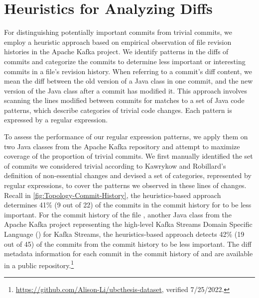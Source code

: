 \section{Heuristics for Analyzing Diffs}
\label{sec:Heuristics}

For distinguishing potentially important commits from trivial commits, 
we employ a heuristic approach based on empirical observation of file revision histories in the Apache Kafka project.
We identify patterns in the diffs of commits and categorize the commits 
to determine less important or interesting commits in a file's revision history.
When referring to a commit's diff content, we mean the diff between the old version of a Java class in one commit, 
and the new version of the Java class after a commit has modified it.
This approach involves scanning the lines modified between commits for matches to a set of Java code patterns, 
which describe categories of trivial code changes.
Each pattern is expressed by a regular expression.

To assess the performance of our regular expression patterns, 
we apply them on two Java classes from the Apache Kafka repository and attempt to maximize coverage of the proportion of trivial commits.
We first manually identified the set of commits we considered trivial according to Kawrykow and Robillard's definition of non-essential changes \cite{kawrykow_non-essential_2011} and devised a set of categories, represented by regular expressions, to cover the patterns we observed in these lines of changes.
Recall in \autoref{fig:Topology-Commit-History}, the heuristics-based approach determines 41\% (9 out of 22) of the commits in the commit history for  to be less important.
For the commit history of the file , another Java class from the Apache Kafka project 
representing the high-level Kafka Streams Domain Specific Language () for Kafka Streams, 
the heuristics-based approach detects 42\% (19 out of 45) of the commits from the commit history to be less important.
The diff metadata information for each commit in the commit history of  
and  are available in a public repository.\footnote{\url{https://github.com/Alison-Li/ubcthesis-dataset}, verified 7/25/2022.}

